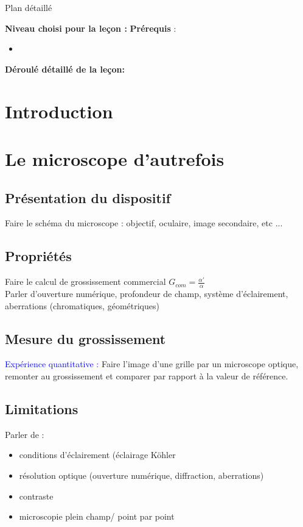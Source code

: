 \begin{reportBlock}{Plan détaillé}

  \textbf{Niveau choisi pour la leçon :} 
  \newline
  \textbf{Prérequis} : \begin{itemize}
      \item 
  \end{itemize}

  \textbf{Déroulé détaillé de la leçon: }  
  
  \section*{Introduction}


  \section{Le microscope \og d'autrefois \fg }

  \subsection{Présentation du dispositif}
  Faire le schéma du microscope : objectif, oculaire, image secondaire, etc ...

  \subsection{Propriétés}
  Faire le calcul de grossissement commercial $G_{com}=\frac{\alpha'}{\alpha}$\\
  Parler d'ouverture numérique, profondeur de champ, système d'éclairement, aberrations (chromatiques, géométriques)
  \subsection{Mesure du grossissement}
 
  \textcolor{blue}{Expérience quantitative :} Faire l'image d'une grille par un microscope optique, remonter au grossissement et comparer par rapport à la valeur de référence.

  \subsection{Limitations}
  Parler de : 
  \begin{itemize}
      \item conditions d'éclairement (éclairage Köhler
      \item résolution optique (ouverture numérique, diffraction, aberrations) 
      \item contraste
      \item microscopie plein champ/ point par point
  \end{itemize}



\end{reportBlock}
